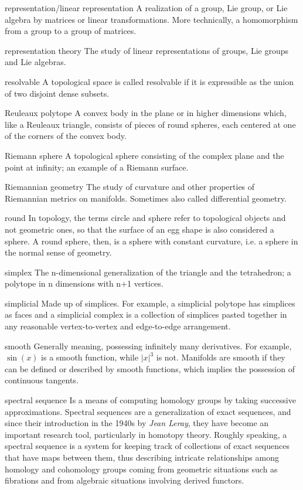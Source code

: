 \begin{description}
\begin{tiny}
\item[representation/linear representation] A realization of a group, Lie group, or Lie algebra by matrices or linear transformations. More technically, a homomorphism from a group to a group of matrices.
\item[representation theory] The study of linear representations of groups, Lie groups and Lie algebras.
\item[resolvable] A topological space is called resolvable if it is expressible as the union of two disjoint dense subsets.
\item[Reuleaux polytope] A convex body in the plane or in higher dimensions which, like a Reuleaux triangle, consists of pieces of round spheres, each centered at one of the corners of the convex body.
\item[Riemann sphere] A topological sphere consisting of the complex plane and the point at infinity; an example of a Riemann surface.
\item[Riemannian geometry] The study of curvature and other properties of Riemannian metrics on manifolds. Sometimes also called differential geometry.
\item[round] In topology, the terms circle and sphere refer to topological objects and not geometric ones, so that the surface of an egg shape is also considered a sphere.  A round sphere, then, is a sphere with constant curvature, i.e. a sphere in the normal sense of geometry.
\item[simplex] The n-dimensional generalization of the triangle and the tetrahedron; a polytope in n dimensions with n+1 vertices.
\item[simplicial] Made up of simplices. For example, a simplicial polytope has simplices as faces and a simplicial complex is a collection of simplices pasted together in any reasonable vertex-to-vertex and edge-to-edge arrangement.
\item[smooth] Generally meaning, possessing infinitely many derivatives. For example, $\sin(x)$ is a smooth function, while $|x|^{3}$ is not.  Manifolds are smooth if they can be defined or described by smooth functions, which implies the possession of continuous tangents.
\item[spectral sequence] Is a means of computing homology groups by taking successive approximations. Spectral sequences are a generalization of exact sequences, and since their introduction in the 1940s by \textit{Jean Leray}, they have become an important research tool, particularly in homotopy theory. Roughly speaking, a spectral sequence is a system for keeping track of collections of exact sequences that have maps between them, thus describing intricate relationships among homology and cohomology groups coming from geometric situations such as fibrations and from algebraic situations involving derived functors.

\end{tiny}
\end{description}
